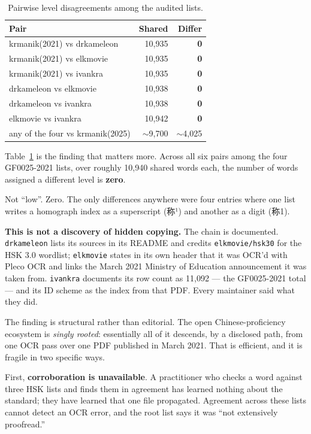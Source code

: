 \documentclass[11pt]{article}
\begin{document}
\begin{table}[t]
\centering\small
\begin{tabular}{@{}lrr@{}}
\toprule
\textbf{Pair} & \textbf{Shared} & \textbf{Differ} \\
\midrule
krmanik(2021) vs drkameleon & 10{,}935 & \textbf{0} \\
krmanik(2021) vs elkmovie   & 10{,}935 & \textbf{0} \\
krmanik(2021) vs ivankra    & 10{,}935 & \textbf{0} \\
drkameleon vs elkmovie      & 10{,}938 & \textbf{0} \\
drkameleon vs ivankra       & 10{,}938 & \textbf{0} \\
elkmovie vs ivankra         & 10{,}942 & \textbf{0} \\
\addlinespace
any of the four vs krmanik(2025) & $\sim$9{,}700 & $\sim$4{,}025 \\
\bottomrule
\end{tabular}
\caption{Pairwise level disagreements among the audited lists.}
\label{tab:pairs}
\end{table}

Table~\ref{tab:pairs} is the finding that matters more. Across all six pairs
among the four GF0025-2021 lists, over roughly 10{,}940 shared words each, the
number of words assigned a different level is \textbf{zero}.

Not ``low''. Zero. The only differences anywhere were four entries where one list
writes a homograph index as a superscript (称¹) and another as a digit (称1).

\textbf{This is not a discovery of hidden copying.} The chain is documented.
\texttt{drkameleon} lists its sources in its README and credits
\texttt{elkmovie/hsk30} for the HSK 3.0 wordlist; \texttt{elkmovie} states in its
own header that it was OCR'd with Pleco OCR and links the March 2021 Ministry of
Education announcement it was taken from. \texttt{ivankra} documents its row
count as 11{,}092 --- the GF0025-2021 total --- and its ID scheme as the index
from that PDF. Every maintainer said what they did.

The finding is structural rather than editorial. The open Chinese-proficiency
ecosystem is \emph{singly rooted}: essentially all of it descends, by a
disclosed path, from one OCR pass over one PDF published in March 2021. That is
efficient, and it is fragile in two specific ways.

First, \textbf{corroboration is unavailable}. A practitioner who checks a word
against three HSK lists and finds them in agreement has learned nothing about the
standard; they have learned that one file propagated. Agreement across these
lists cannot detect an OCR error, and the root list says it was ``not
extensively proofread.''
\end{document}

